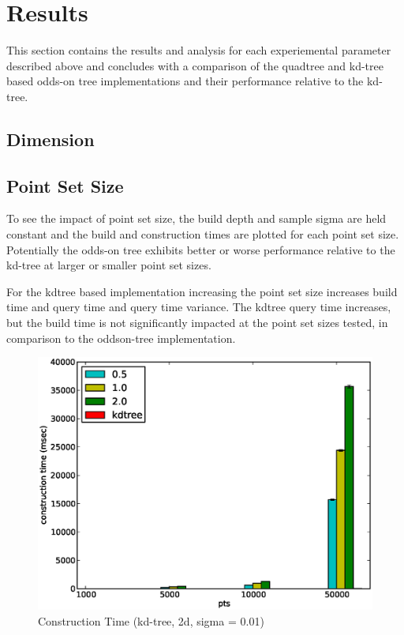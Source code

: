 \documentclass[mcs]{scsthesis}
\begin{document}
\section{Results}

This section contains the results and analysis for each experiemental
parameter described above and concludes with a comparison of the quadtree and
kd-tree based odds-on tree implementations and their performance relative to
the kd-tree.

\subsection{Dimension}

\subsection{Point Set Size}

To see the impact of point set size, the build depth and sample sigma are held
constant and the build and construction times are plotted for each point set
size. Potentially the odds-on tree exhibits better or worse performance relative
to the kd-tree at larger or smaller point set sizes.

For the kdtree based implementation increasing the point set size increases
build time and query time and query time variance. The kdtree query time
increases, but the build time is not significantly impacted at the point set
sizes tested, in comparison to the oddson-tree implementation.

\begin{figure}
\begin{center}
\includegraphics[scale=0.5]{diagrams/2d_group_bypts_sigma0.01_ctime.eps}
\caption{Construction Time (kd-tree, 2d, sigma = 0.01)}
\label{fig:point_set_size_ctime}
\end{center}
\end{figure}
\end{document}
